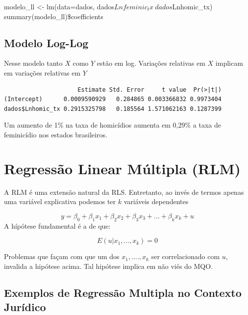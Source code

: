 \documentclass[
  letterpaper,
  DIV=11,
  numbers=noendperiod]{scrreprt}
\newenvironment{Shaded}{\begin{snugshade}}{\end{snugshade}}
\newcommand{\AttributeTok}[1]{\textcolor[rgb]{0.40,0.45,0.13}{#1}}
\newcommand{\FunctionTok}[1]{\textcolor[rgb]{0.28,0.35,0.67}{#1}}
\newcommand{\NormalTok}[1]{\textcolor[rgb]{0.00,0.23,0.31}{#1}}
\newcommand{\OtherTok}[1]{\textcolor[rgb]{0.00,0.23,0.31}{#1}}
\newcommand{\SpecialCharTok}[1]{\textcolor[rgb]{0.37,0.37,0.37}{#1}}
\begin{document}
modelo\_ll \textless- lm(data=dados,
dados\(Lnfeminic_tx~ dados\)Lnhomic\_tx)
summary(modelo\_ll)\$coefficients

\subsection{Modelo Log-Log}\label{modelo-log-log}

Nesse modelo tanto \(X\) como \(Y\) estão em log. Variações relativas em
\(X\) implicam em variações relativas em \(Y\)

\begin{Shaded}
\end{Shaded}

\begin{verbatim}
                     Estimate Std. Error     t value  Pr(>|t|)
(Intercept)      0.0009590929   0.284865 0.003366832 0.9973404
dados$Lnhomic_tx 0.2915325798   0.185564 1.571062163 0.1287399
\end{verbatim}

Um aumento de 1\% na taxa de homicídios aumenta em 0,29\% a taxa de
feminicídio nos estados brasileiros.

\section{Regressão Linear Múltipla
(RLM)}\label{regressuxe3o-linear-muxfaltipla-rlm}

A RLM é uma extensão natural da RLS. Entretanto, ao invés de termos
apenas uma variável explicativa podemos ter \(k\) variáveis dependentes

\[y = \beta_0 + \beta_1 x_1 + \beta_2 x_2 + \beta_3 x_3 + \ldots + \beta_k x_k + u\]
A hípótese fundamental é a de que:

\[E(u|x_1, . . . ,x_k) = 0\]

Problemas que façam com que um dos \(x_1, ...., x_k\) ser correlacionado
com \(u\), invalida a hipótese acima. Tal hipótese implica em não viés
do MQO.

\subsection{Exemplos de Regressão Multipla no Contexto
Jurídico}\label{exemplos-de-regressuxe3o-multipla-no-contexto-juruxeddico}
\end{document}
